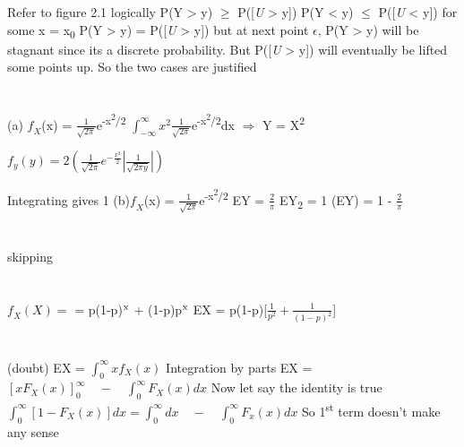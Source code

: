\documentclass{report}
\begin{document}
Refer to figure 2.1
{\newline}
logically P(Y > y) $\ge$ P([\textit{U} > y])
{\newline}
P(Y < y) $\le$ P([\textit{U} < y])
{\newline}
for some x = x{\textsubscript{0}}
P(Y > y) = P([\textit{U} > y])
but at next point {$\epsilon$}, P(Y > y) will be stagnant since its a discrete probability. But P([\textit{U} > y]) will eventually be lifted some points up. So the two cases are justified

\section{}
(a) {$\textit{f}_{\textit{X}}$}(x) = {$\frac{1}{\sqrt{2\pi}}$}e{\textsuperscript{-x{\textsuperscript{2}/2}}}
{\newline}
{$\int_{-\infty}^{\infty}x^{2}$}{$\frac{1}{\sqrt{2\pi}}$}e{\textsuperscript{-x{\textsuperscript{2}/2}}}dx
{\newline} {$\Rightarrow$} Y = X{\textsuperscript{2}}

{$f_{y}(y) = 2(\frac{1}{\sqrt{2\pi}}e^{-\frac{x^{2}}{2}}|\frac{1}{\sqrt{2\pi y}}|)$}

Integrating gives 1
{\newline}
(b){$\textit{f}_{\textit{X}}$}(x) = {$\frac{1}{\sqrt{2\pi}}$}e{\textsuperscript{-x{\textsuperscript{2}/2}}}
EY = {$\frac{2}{\pi}$}
EY{\textsubscript{2}} = 1
{\newline}
(EY) = 1 - {$\frac{2}{\pi}$}
\section{}
skipping

\section{}
{$\textit{f}_{\textit{X}}(X) = $} = p(1-p){$\textsuperscript{x}$} + (1-p)p{$\textsuperscript{x}$}
{\newline}
EX = p(1-p)[$\frac{1}{p^{2}} + \frac{1}{(1-p)^{2}}$]
{\newline}

\section{}
(doubt) EX = {$\int_{0}^{\infty}xf_{X}(x)$} Integration by parts
{\newline}
EX = {$\left[xF_{X}(x)\right]_{0}^{\infty} \quad - \quad \int_{0}^{\infty}F_{X}(x)dx$}
Now let say the identity is true
{\newline}
{$\int_{0}^{\infty}[1 - F_{X}(x)]dx = \int_{0}^{\infty}dx \quad - \quad \int_{0}^{\infty}F_{x}(x)dx$} 
{\newline}
So 1{\textsuperscript{st}} term doesn't make any sense
{\newline}
\end{document}
